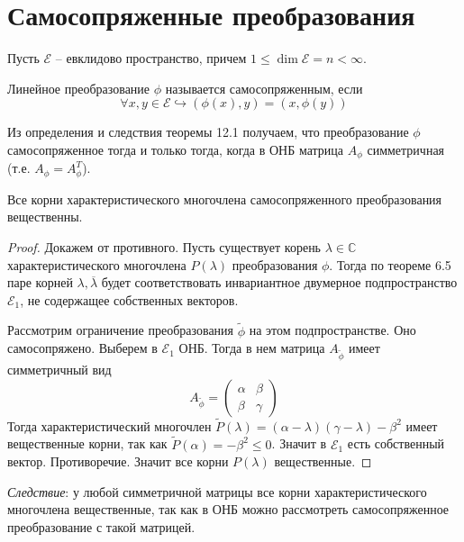 \section{Самосопряженные преобразования}
Пусть $\mathcal{E}$ -- евклидово пространство, причем $1\leqslant\dim \mathcal{E}=n<\infty$.

\begin{definition}
    Линейное преобразование $\phi$ называется самосопряженным, если 
    \[
    \forall x,y\in \mathcal{E}\hookrightarrow (\phi(x), y)=(x,\phi(y))
    \]
\end{definition}
Из определения и следствия теоремы 12.1 получаем, что преобразование $\phi$ самосопряженное тогда и только тогда, когда в ОНБ матрица $A_{\phi}$ симметричная (т.е. $A_{\phi}=A_{\phi}^T$).

\begin{theorem}
    Все корни характеристического многочлена самосопряженного преобразования вещественны.
\end{theorem}
\begin{proof}
    Докажем от противного. Пусть существует корень $\lambda\in \mathbb{C}$ характеристического многочлена $P(\lambda)$ преобразования $\phi$. Тогда по теореме 6.5 паре корней $\lambda, \overline{\lambda}$ будет соответствовать инвариантное двумерное подпространство $\mathcal{E}_1$, не содержащее собственных векторов.

    Рассмотрим ограничение преобразования $\tilde{\phi}$ на этом подпространстве. Оно самосопряжено. Выберем в $\mathcal{E}_1$ ОНБ. Тогда в нем матрица $A_{\tilde{\phi}}$ имеет симметричный вид
    \[
    A_{\tilde{\phi}}=\begin{pmatrix}
        \alpha & \beta \\
        \beta & \gamma
    \end{pmatrix}
    \]
    Тогда характеристический многочлен $\tilde{P}(\lambda)=(\alpha-\lambda)(\gamma-\lambda) - \beta^2$ имеет вещественные корни, так как $\tilde{P}(\alpha)=-\beta^2 \leqslant0$. Значит в $\mathcal{E}_1$ есть собственный вектор. Противоречие. Значит все корни $P(\lambda)$ вещественные.
\end{proof}

\textit{Следствие}: у любой симметричной матрицы все корни характеристического многочлена вещественные, так как в ОНБ можно рассмотреть самосопряженное преобразование с такой матрицей.

